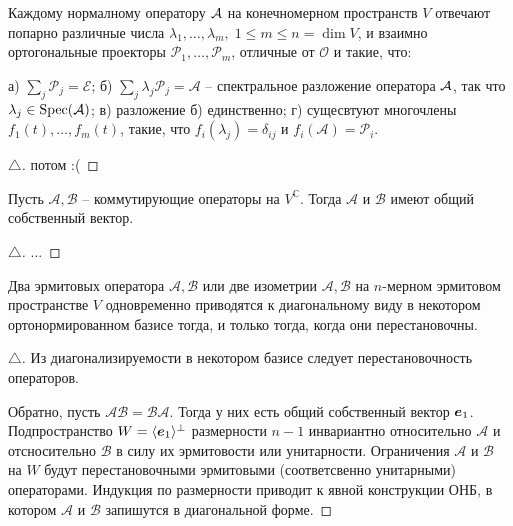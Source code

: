 \begin{to_thr} 
    Каждому нормалному оператору $\mathcal A$ на конечномерном пространств $V$ отвечают попарно различные числа $\lambda_{1}, \ldots, \lambda_m, \; 1 \leq m \leq n = \dim V$, и взаимно ортогональные проекторы $\mathcal P_{1}, \ldots, \mathcal P_m$, отличные от $\mathcal O$ и такие, что:

    а) $\sum_j \mathcal P_j = \mathcal E$;
    б) $\sum_j \lambda_j \mathcal P_j = \mathcal A$ -- спектральное разложение оператора $\mathcal A$,  так что $\lambda_j \in \text{Spec} (\mathcal A)$;
    в) разложение б) единственно;
    г) сущесвтуют многочлены $f_{1}(t), \ldots, f_m(t)$, такие, что
    $f_i (\lambda_j) = \delta_{ij}$ и $f_i(\mathcal A) = \mathcal P_i$.
\end{to_thr}

\begin{proof}[$\triangle$]
    потом :(
\end{proof}

\begin{to_lem} 
    Пусть $\mathcal A, \mathcal B$ -- коммутирующие операторы на $V^{\mathbb{ C}}$. Тогда $\mathcal A$ и $\mathcal B$ имеют общий собственный вектор. 
\end{to_lem}


\begin{proof}[$\triangle$]
   ... 
\end{proof}


\begin{to_thr} 
    Два эрмитовых оператора $\mathcal A, \mathcal B$ или две изометрии $\mathcal A, \mathcal B$ на $n$-мерном эрмитовом пространстве $V$ одновременно приводятся к диагональному виду в некотором ортонормированном базисе тогда, и только тогда, когда они перестановочны.
\end{to_thr}

\begin{proof}[$\triangle$]
    Из диагонализируемости в некотором базисе следует перестановочность операторов.

    Обратно, пусть $\mathcal{AB} = \mathcal{BA}$. Тогда у них есть общий собственный вектор $\mbox{\boldmath $e$}_{1}$. Подпространство $W = \langle \mbox{\boldmath $e$}_1\rangle^{\bot}$ размерности $n-1$ инвариантно относительно $\mathcal A$ и отсносительно $\mathcal B$ в силу их эрмитовости или унитарности. Ограничения $\mathcal A$ и $\mathcal B$  на $W$ будут перестановочными эрмитовыми (соответсвенно унитарными) операторами. Индукция по размерности приводит к явной конструкции ОНБ, в котором $\mathcal A$ и $\mathcal B$ запишутся в диагональной форме.
\end{proof}

